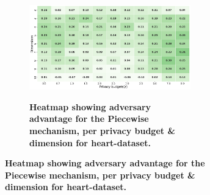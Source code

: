 \begin{figure}[H]
\begin{subfigure}[b]{0.85\textwidth}
            \begin{subfigure}[c]{1\textwidth}
                  \caption{\textbf{Heatmap showing adversary advantage for the Piecewise mechanism, per privacy budget \& dimension for heart-dataset.}}
                  \includegraphics[width=1\textwidth]{Results/kd-laplace/piecewise/heart-dataset/shokri_mi_adv.png}
                  \label{fig:privacy_heart-dataset_adversial_advantage_piecewise}
            \end{subfigure}
      \end{subfigure}
      \hfill %
      \begin{subfigure}[b]{0.075\textwidth}

\end{subfigure}
\end{figure}
